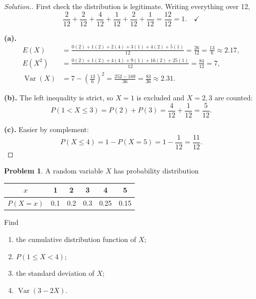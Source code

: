 \documentclass[12pt,a4paper]{report}
\theoremstyle{definition}
\theoremstyle{plain}
\theoremstyle{definition}
\newtheorem{problemx}{Problem}[section]
\newenvironment{problem}{\begin{problemx}}{\end{problemx}}
\newenvironment{solution}
  {\renewcommand{\qedsymbol}{}\begin{proof}[\textit{Solution}.]}
  {\end{proof}}
\let\amscheckmark\checkmark
\renewcommand{\checkmark}{\ensuremath{\amscheckmark}}
\begin{document}
\begin{solution}
First check the distribution is legitimate. Writing everything over 12,
\[\frac{2}{12}+\frac{2}{12}+\frac{4}{12}+\frac{1}{12}+\frac{2}{12}+\frac{1}{12}
 = \frac{12}{12} = 1. \quad\checkmark\]

\textbf{(a).}
\begin{align*}
E(X) &= \frac{0(2)+1(2)+2(4)+3(1)+4(2)+5(1)}{12} = \frac{26}{12} = \frac{13}{6}
 \approx 2.17,\\
E(X^{2}) &= \frac{0(2)+1(2)+4(4)+9(1)+16(2)+25(1)}{12} = \frac{84}{12} = 7,\\
\operatorname{Var}(X) &= 7-\left(\frac{13}{6}\right)^{2} = \frac{252-169}{36}
 = \frac{83}{36} \approx 2.31.
\end{align*}

\textbf{(b).} The left inequality is strict, so $X=1$ is excluded and $X=2,3$ are counted:
\[P(1<X\leq 3) = P(2)+P(3) = \frac{4}{12}+\frac{1}{12} = \frac{5}{12}.\]

\textbf{(c).} Easier by complement:
\[P(X\leq 4) = 1-P(X=5) = 1-\frac{1}{12} = \frac{11}{12}.\]
\end{solution}

\begin{problem}
A random variable $X$ has probability distribution
\begin{table}[H]
\centering
\begin{tabular}{c|ccccc}
$x$ & 1 & 2 & 3 & 4 & 5\\
\hline
$P(X=x)$ & 0.1 & 0.2 & 0.3 & 0.25 & 0.15\\
\end{tabular}
\end{table}
Find
\begin{enumerate}
\item[(a).] the cumulative distribution function of $X$;
\item[(b).] $P(1\leq X<4)$;
\item[(c).] the standard deviation of $X$;
\item[(d).] $\operatorname{Var}(3-2X)$.
\end{enumerate}
\end{problem}
\end{document}
